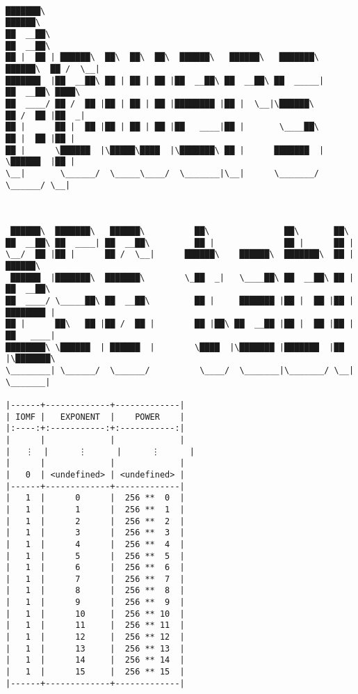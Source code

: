 \documentclass[varwidth=\maxdimen,margin=0.5cm,multi={verbatim}]{standalone}
\begin{document}
\begin{verbatim}

███████\                                                                         ██████\
██  __██\                                                                       ██  __██\
██ |  ██ | ██████\  ██\  ██\  ██\  ██████\   ██████\   ███████\        ██████\  ██ /  \__|
███████  |██  __██\ ██ | ██ | ██ |██  __██\ ██  __██\ ██  _____|      ██  __██\ ████\
██  ____/ ██ /  ██ |██ | ██ | ██ |████████ |██ |  \__|\██████\        ██ /  ██ |██  _|
██ |      ██ |  ██ |██ | ██ | ██ |██   ____|██ |       \____██\       ██ |  ██ |██ |
██ |      \██████  |\█████\████  |\███████\ ██ |      ███████  |      \██████  |██ |
\__|       \______/  \_____\____/  \_______|\__|      \_______/        \______/ \__|



 ██████\  ███████\   ██████\          ██\               ██\       ██\
██  __██\ ██  ____| ██  __██\         ██ |              ██ |      ██ |
\__/  ██ |██ |      ██ /  \__|      ██████\    ██████\  ███████\  ██ | ██████\
 ██████  |███████\  ███████\        \_██  _|   \____██\ ██  __██\ ██ |██  __██\
██  ____/ \_____██\ ██  __██\         ██ |     ███████ |██ |  ██ |██ |████████ |
██ |      ██\   ██ |██ /  ██ |        ██ |██\ ██  __██ |██ |  ██ |██ |██   ____|
████████\ \██████  | ██████  |        \████  |\███████ |███████  |██ |\███████\
\________| \______/  \______/          \____/  \_______|\_______/ \__| \_______|

|------+-------------+-------------|
| IOMF |   EXPONENT  |    POWER    |
|:----:+:-----------:+:-----------:|
|      |             |             |
|   ⋮  |      ⋮      |      ⋮      |
|      |             |             |
|   0  | <undefined> | <undefined> |
|------+-------------+-------------|
|   1  |      0      |  256 **  0  |
|   1  |      1      |  256 **  1  |
|   1  |      2      |  256 **  2  |
|   1  |      3      |  256 **  3  |
|   1  |      4      |  256 **  4  |
|   1  |      5      |  256 **  5  |
|   1  |      6      |  256 **  6  |
|   1  |      7      |  256 **  7  |
|   1  |      8      |  256 **  8  |
|   1  |      9      |  256 **  9  |
|   1  |      10     |  256 ** 10  |
|   1  |      11     |  256 ** 11  |
|   1  |      12     |  256 ** 12  |
|   1  |      13     |  256 ** 13  |
|   1  |      14     |  256 ** 14  |
|   1  |      15     |  256 ** 15  |
|------+-------------+-------------|

\end{verbatim}
\end{document}
